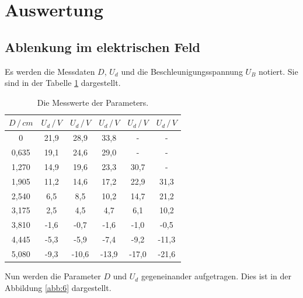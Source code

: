 \section{Auswertung}
\subsection{Ablenkung im elektrischen Feld}
Es werden die Messdaten $D$, $U_d$ und die Beschleunigungsspannung $U_B$ notiert.
Sie sind in der Tabelle \ref{tab:1} dargestellt.

\begin{table}[H]
  \centering
  \caption{Die Messwerte der Parameters.}
  \label{tab:1}
  \begin{tabular}{c c c c c c}
\toprule
$D \, / \, cm$ & $U_d \, / \, V$ & $U_d \, / \, V$ & $U_d \, / \, V$ &$U_d \, / \, V$ & $U_d \, / \, V$\\
\midrule
0     & 21,9  & 28,9  & 33,8  & -    & -   \\
0,635 & 19,1  & 24,6  & 29,0  & -    & -   \\
1,270 & 14,9  & 19,6  & 23,3  & 30,7 & -   \\
1,905 & 11,2  & 14,6  & 17,2  & 22,9 & 31,3\\
2,540 &  6,5  &  8,5  & 10,2  & 14,7 & 21,2\\
3,175 &  2,5  &  4,5  &  4,7  &  6,1 & 10,2\\
3,810 & -1,6  & -0,7  & -1,6  & -1,0 & -0,5\\
4,445 & -5,3  & -5,9  & -7,4  & -9,2 &-11,3\\
5,080 & -9,3  &-10,6  &-13,9  &-17,0 &-21,6\\
\bottomrule
  \end{tabular}
\end{table}
Nun werden die Parameter $D$ und $U_d$ gegeneinander aufgetragen.
Dies ist in der Abbildung \ref{abb:6} dargestellt.
